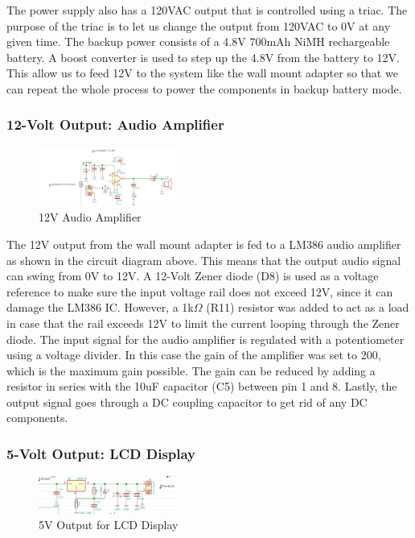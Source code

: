 \documentclass[journal,compsoc]{IEEEtran}
\begin{document}
The power supply also has a 120VAC output that is controlled using a triac. The purpose of the triac is to let us change the output from 120VAC to 0V at any given time. The backup power consists of a 4.8V 700mAh NiMH rechargeable battery. A boost converter is used to step up the 4.8V from the battery to 12V. This allow us to feed 12V to the system like the wall mount adapter so that we can repeat the whole process to power the components in backup battery mode.

\subsubsection{12-Volt Output: Audio Amplifier}

\begin{figure}[ht]	%
\centering
\includegraphics[width=0.4\textwidth]{Audio.png}
\caption{ 12V Audio Amplifier}
\label{Paudio}
\end{figure}

The 12V output from the wall mount adapter is fed to a LM386 audio amplifier as shown in the circuit diagram above. This means that the output audio signal can swing from 0V to 12V. A 12-Volt Zener diode (D8) is used as a voltage reference to make sure the input voltage rail does not exceed 12V, since it can damage the LM386 IC. However, a 1k$\Omega$ (R11) resistor was added to act as a load in case that the rail exceeds 12V to limit the current looping through the Zener diode. The input signal for the audio amplifier is regulated with a potentiometer using a voltage divider. In this case the gain of the amplifier was set to 200, which is the maximum gain possible. The gain can be reduced by adding a resistor in series with the 10uF capacitor (C5) between pin 1 and 8. Lastly, the output signal goes through a DC coupling capacitor to get rid of any DC components. 

\subsubsection {5-Volt Output: LCD Display}

\begin{figure}[ht]	%
\centering
\includegraphics[width=0.4\textwidth]{Linear.png}
\caption{ 5V Output for LCD Display }
\label{Pdisplay}
\end{figure}
\end{document}
